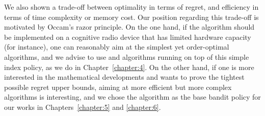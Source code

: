 \clearpage

We also shown a trade-off between optimality in terms of regret, and efficiency in terms of time complexity or memory cost.
Our position regarding this trade-off is motivated by Occam's razor principle.
On the one hand, if the algorithm should be implemented on a cognitive radio device that has limited hardware capacity (for instance),
one can reasonably aim at the simplest yet order-optimal algorithms, and we advise to use \UCB{} and algorithms running on top of this simple index policy, as we do in Chapter~\ref{chapter:4}.
On the other hand, if one is more interested in the mathematical developments and wants to prove the tightest possible regret upper bounds, aiming at more efficient but more complex algorithms is interesting, and we chose the \klUCB{} algorithm as the base bandit policy for our works in Chapters~\ref{chapter:5} and \ref{chapter:6}.











